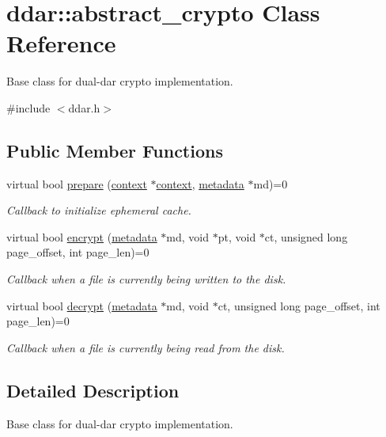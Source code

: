 \hypertarget{classddar_1_1abstract__crypto}{\section{ddar\-:\-:abstract\-\_\-crypto \-Class \-Reference}
\label{classddar_1_1abstract__crypto}
}


\-Base class for dual-\/dar crypto implementation.  




{\ttfamily \#include $<$ddar.\-h$>$}

\subsection*{\-Public \-Member \-Functions}
\begin{DoxyCompactItemize}
\item 
virtual bool \hyperlink{classddar_1_1abstract__crypto_a1f1a4d550c0840b4e04bc6d6129a0f13}{prepare} (\hyperlink{classddar_1_1context}{context} $\ast$\hyperlink{classddar_1_1context}{context}, \hyperlink{classddar_1_1metadata}{metadata} $\ast$md)=0
\begin{DoxyCompactList}\small\item\em \-Callback to initialize ephemeral cache. \end{DoxyCompactList}\item 
virtual bool \hyperlink{classddar_1_1abstract__crypto_a17eef7aebf0ef97684af036b657a9947}{encrypt} (\hyperlink{classddar_1_1metadata}{metadata} $\ast$md, void $\ast$pt, void $\ast$ct, unsigned long page\-\_\-offset, int page\-\_\-len)=0
\begin{DoxyCompactList}\small\item\em \-Callback when a file is currently being written to the disk. \end{DoxyCompactList}\item 
virtual bool \hyperlink{classddar_1_1abstract__crypto_aaaf5ca9de70bf1b902cecc72049653b8}{decrypt} (\hyperlink{classddar_1_1metadata}{metadata} $\ast$md, void $\ast$ct, unsigned long page\-\_\-offset, int page\-\_\-len)=0
\begin{DoxyCompactList}\small\item\em \-Callback when a file is currently being read from the disk. \end{DoxyCompactList}\end{DoxyCompactItemize}


\subsection{\-Detailed \-Description}
\-Base class for dual-\/dar crypto implementation. 

